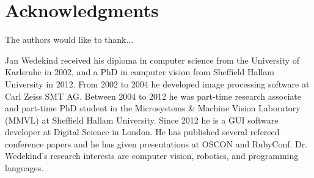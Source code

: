 \documentclass[10pt,journal,compsoc]{joser1}
\begin{document}
%
%
%
\section*{Acknowledgments}
The authors would like to thank...





\begin{IEEEbiography}[{wedekind_20131110_f06}]{Jan Wedekind}
received his diploma in computer science from the University of Karlsruhe
in 2002, and a PhD in computer vision from Sheffield Hallam University
in 2012. From 2002 to 2004 he developed image processing software at
Carl Zeiss SMT AG. Between 2004 to 2012 he was part-time research associate
and part-time PhD student in the Microsystems \& Machine Vision Laboratory
(MMVL) at Sheffield Hallam University. Since 2012 he is a GUI software developer
at Digital Science in London. He has published several refereed conference
papers and he has given presentations at OSCON and RubyConf.  Dr. Wedekind's
research interests are computer vision, robotics, and programming languages.
\end{IEEEbiography}
\end{document}
